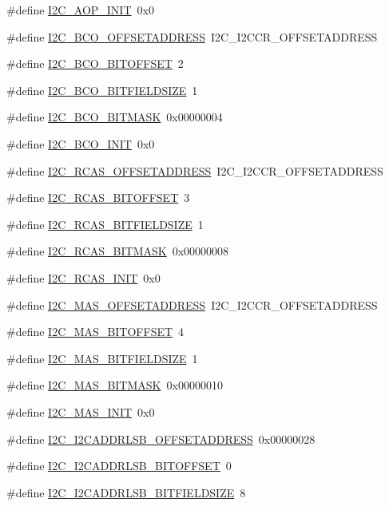 \begin{DoxyCompactItemize}
\#define \hyperlink{a00558_af46babcc5a5168e3a87d0e429e909200}{I2C\_\-AOP\_\-INIT}~0x0
\item 
\#define \hyperlink{a00558_a0b7d915d21c6c29c146a2510d5cf4de4}{I2C\_\-BCO\_\-OFFSETADDRESS}~I2C\_\-I2CCR\_\-OFFSETADDRESS
\item 
\#define \hyperlink{a00558_a23c3d41334b19dd969a55e5d36249ae3}{I2C\_\-BCO\_\-BITOFFSET}~2
\item 
\#define \hyperlink{a00558_a28ed47f7496b12cc10f64a1077732ab0}{I2C\_\-BCO\_\-BITFIELDSIZE}~1
\item 
\#define \hyperlink{a00558_a1c9cd4a20ad45146bf755c2ff23c0932}{I2C\_\-BCO\_\-BITMASK}~0x00000004
\item 
\#define \hyperlink{a00558_a8e787068429f40f48510ded243374798}{I2C\_\-BCO\_\-INIT}~0x0
\item 
\#define \hyperlink{a00558_a7bf10faba963abf321f4394fe0d1ca8a}{I2C\_\-RCAS\_\-OFFSETADDRESS}~I2C\_\-I2CCR\_\-OFFSETADDRESS
\item 
\#define \hyperlink{a00558_a51984dce8b149e95f198ac0480dd6b58}{I2C\_\-RCAS\_\-BITOFFSET}~3
\item 
\#define \hyperlink{a00558_a7c50810f0b7080927725dd2c87b46c7c}{I2C\_\-RCAS\_\-BITFIELDSIZE}~1
\item 
\#define \hyperlink{a00558_a7eceaae599c8b900a45c3f8d1aa21705}{I2C\_\-RCAS\_\-BITMASK}~0x00000008
\item 
\#define \hyperlink{a00558_ab09d09b71faf04ac627a5a04a7a2b7ea}{I2C\_\-RCAS\_\-INIT}~0x0
\item 
\#define \hyperlink{a00558_acb32e8093c8b2f4235ca3982531ec79a}{I2C\_\-MAS\_\-OFFSETADDRESS}~I2C\_\-I2CCR\_\-OFFSETADDRESS
\item 
\#define \hyperlink{a00558_ab0d92e3eb194bc2b5a7e7aa192b97047}{I2C\_\-MAS\_\-BITOFFSET}~4
\item 
\#define \hyperlink{a00558_a398c17b70171c09d9a049195df5c21bd}{I2C\_\-MAS\_\-BITFIELDSIZE}~1
\item 
\#define \hyperlink{a00558_a8e267a560fb2b29dfae0923345e8458b}{I2C\_\-MAS\_\-BITMASK}~0x00000010
\item 
\#define \hyperlink{a00558_a60afd7872b40ef319ad1041fea20c194}{I2C\_\-MAS\_\-INIT}~0x0
\item 
\#define \hyperlink{a00558_a309191450332e4103bf64d7a4f1ad1dc}{I2C\_\-I2CADDRLSB\_\-OFFSETADDRESS}~0x00000028
\item 
\#define \hyperlink{a00558_af690d9325b3db66d4719431ea4a0a6e0}{I2C\_\-I2CADDRLSB\_\-BITOFFSET}~0
\item 
\#define \hyperlink{a00558_a915cabe3cabf53d48c266b4a51ecae6c}{I2C\_\-I2CADDRLSB\_\-BITFIELDSIZE}~8

\end{DoxyCompactItemize}
